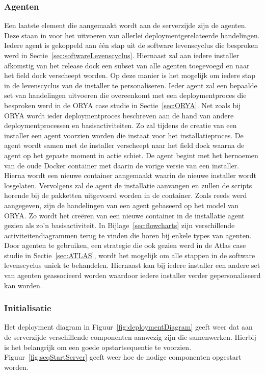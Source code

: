 \subsubsection{Agenten}
Een laatste element die aangemaakt wordt aan de serverzijde zijn de agenten.
Deze staan in voor het uitvoeren van allerlei deploymentgerelateerde handelingen.
Iedere agent is gekoppeld aan één stap uit de software levenscyclus die besproken werd in Sectie~\ref{sec:softwareLevenscyclus}.
Hiernaast zal aan iedere installer afkomstig van het release dock een subset van alle agenten toegevoegd en  naar het field dock verscheept worden.
Op deze manier is het mogelijk om iedere stap in de levenscyclus van de installer te personaliseren.
Ieder agent zal een bepaalde set van handelingen uitvoeren die overeenkomt met een deploymentproces die besproken werd in de ORYA case studie in Sectie~\ref{sec:ORYA}.
Net zoals bij ORYA wordt ieder deploymentproces beschreven aan de hand van andere deploymentprocessen en basisactiviteiten.
Zo zal tijdens de creatie van een installer een agent voorzien worden die instaat voor het installatieproces.
De agent wordt samen met de installer verscheept naar het field dock waarna de agent op het gepaste moment in actie schiet.
De agent begint met het hernoemen van de oude Docker container met daarin de vorige versie van een installer.
Hierna wordt een nieuwe container aangemaakt waarin de nieuwe installer wordt losgelaten.
Vervolgens zal de agent de installatie aanvangen en zullen de scripts horende bij de pakketten uitgevoerd worden in de container.
Zoals reeds werd aangegeven, zijn de handelingen van een agent gebaseerd op het model van ORYA.
Zo wordt het creëren van een nieuwe container in de installatie agent gezien als zo'n basisactiviteit.
In Bijlage~\ref{sec:flowcharts} zijn verschillende activiteitendiagrammen terug te vinden die horen bij enkele types van agenten.
Door agenten te gebruiken, een strategie die ook gezien werd in de Atlas case studie in Sectie~\ref{sec:ATLAS}, wordt het mogelijk om alle stappen in de software levenscyclus uniek te behandelen.
Hiernaast kan bij iedere installer een andere set van agenten geassocieerd worden waardoor iedere installer verder gepersonaliseerd kan worden.

\subsubsection{Initialisatie}\label{sec:initServer}
Het deployment diagram in Figuur~\ref{fig:deploymentDiagram} geeft weer dat aan de serverzijde verschillende componenten aanwezig zijn die samenwerken.
Hierbij is het belangrijk om een goede opstartsequentie te voorzien.
Figuur~\vref{fig:seqStartServer} geeft weer hoe de nodige componenten opgestart worden.

